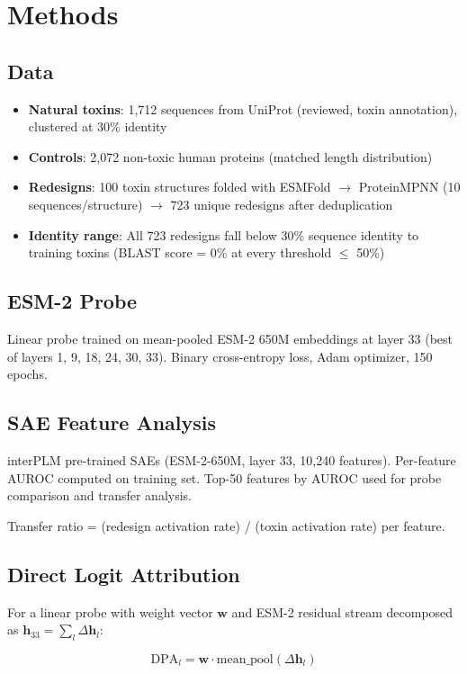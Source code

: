 \documentclass[11pt,a4paper]{article}
\begin{document}
\section{Methods}

\subsection{Data}
\begin{itemize}
    \item \textbf{Natural toxins}: 1,712 sequences from UniProt (reviewed, toxin annotation), clustered at 30\% identity  
    \item \textbf{Controls}: 2,072 non-toxic human proteins (matched length distribution)  
    \item \textbf{Redesigns}: 100 toxin structures folded with ESMFold $\rightarrow$ ProteinMPNN (10 sequences/structure) $\rightarrow$ 723 unique redesigns after deduplication  
    \item \textbf{Identity range}: All 723 redesigns fall below 30\% sequence identity to training toxins (BLAST score = 0\% at every threshold $\leq$ 50\%)
\end{itemize}

\subsection{ESM-2 Probe}
Linear probe trained on mean-pooled ESM-2 650M embeddings at layer 33 (best of layers 1, 9, 18, 24, 30, 33). Binary cross-entropy loss, Adam optimizer, 150 epochs.

\subsection{SAE Feature Analysis}
interPLM pre-trained SAEs (ESM-2-650M, layer 33, 10,240 features). Per-feature AUROC computed on training set. Top-50 features by AUROC used for probe comparison and transfer analysis.

Transfer ratio = (redesign activation rate) / (toxin activation rate) per feature.

\subsection{Direct Logit Attribution}
For a linear probe with weight vector $\mathbf{w}$ and ESM-2 residual stream decomposed as $\mathbf{h}_{33} = \sum_l \Delta\mathbf{h}_l$:

\begin{equation}
\text{DPA}_l = \mathbf{w} \cdot \text{mean\_pool}(\Delta\mathbf{h}_l)
\end{equation}
\end{document}
